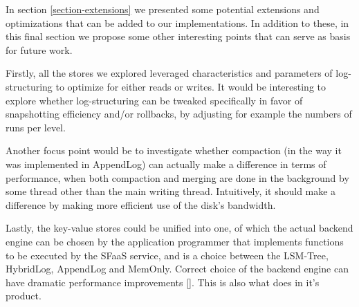 In section \ref{section-extensions} we presented some potential extensions and optimizations that can be added to our implementations.  In addition to these, in this final section we propose some other interesting points that can serve as basis for future work.

Firstly, all the stores we explored leveraged characteristics and parameters of log-structuring to optimize for either reads or writes. It would be interesting to explore whether log-structuring can be tweaked specifically in favor of snapshotting efficiency and/or rollbacks, by adjusting for example the numbers of runs per level.

Another focus point would be to investigate whether compaction (in the way it was implemented in AppendLog) can actually make a difference in terms of performance, when both compaction and merging are done in the background by some thread other than the main writing thread. Intuitively, it should make a difference by making more efficient use of the disk's bandwidth.

Lastly, the key-value stores could be unified into one, of which the actual backend engine can be chosen by the application programmer that implements functions to be executed by the SFaaS service, and is a choice between the LSM-Tree, HybridLog, AppendLog and MemOnly. Correct choice of the backend engine can have dramatic performance improvements [\cite{workload-aware-streaming-state-management}]. This is also what \cite{riak} does in it's product.
